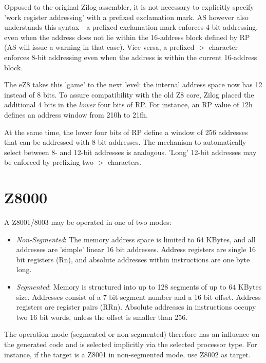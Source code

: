 \documentclass[12pt,twoside]{report}
\begin{document}
Opposed to the original Zilog assembler, it is not necessary to
explicitly specify 'work register addressing' with a prefixed
exclamation mark.  AS however also understands this syntax - a
prefixed exclamation mark enforces 4-bit addressing, even when the
address does not lie within the 16-address block defined by RP (AS will
issue a warning in that case).  Vice versa, a prefixed $>$
character enforces 8-bit addressing even when the address is within
the current 16-address block.

The eZ8 takes this 'game' to the next level: the internal address
space now has 12 instead of 8 bits.  To assure compatibility with the
old Z8 core, Zilog placed the additional 4 bits in the {\em lower}
four bits of RP.  For instance, an RP value of 12h defines an address
window from 210h to 21fh.

At the same time, the lower four bits of RP define a window of 256
addresses that can be addressed with 8-bit addresses.  The mechanism
to automatically select between 8- and 12-bit addresses is analogous.
'Long' 12-bit addresses may be enforced by prefixing two $>$
characters.


\section{Z8000}
\label{Z8000Spec}

A Z8001/8003 may be operated in one of two modes:

\begin{itemize}
\item{{\em Non-Segmented}: The memory address space is limited to 64 KBytes,
      and all addresses are 'simple' linear 16 bit addresses.  Address
      registers are single 16 bit registers (Rn), and absolute addresses
      within instructions are one byte long.}
\item{{\em Segmented}: Memory is structured into up to 128 segments of up
      to 64 KBytes size.  Addresses consist of a 7 bit segment number and a
      16 bit offset. Address registers are register pairs (RRn).  Absolute
      addresses in instructions occupy two 16 bit words, unless the offset
      is smaller than 256.}
\end{itemize}

The operation mode (segmented or non-segmented) therefore has an influence
on the generated code and is selected implicitly via the selected processor
type.  For instance, if the target is a Z8001 in non-segmented mode, use
Z8002 as target.
\end{document}
